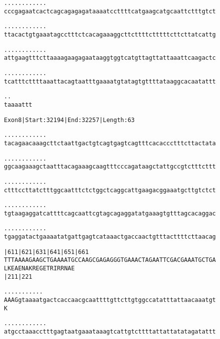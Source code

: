 \documentclass{article}
\begin{document}
\newpage
\begin{alltt}
  .    .    .    .    .    .    .    .    .    .    .    .
cccgagaatcactcagcagagagataaaatccttttcatgaagcatgcaattctttgtct



  .    .    .    .    .    .    .    .    .    .    .    .
ttacactgtgaaatagcctttctcacagaaaggcttcttttctttttcttcttatcattg



  .    .    .    .    .    .    .    .    .    .    .    .
attgaagtttcttaaaagaagagaataaggtggtcatgttagttattaaattcaagactc



  .    .    .    .    .    .    .    .    .    .    .    .
tcatttcttttaaattacagtaatttgaaaatgtatagtgttttataaggcacaatattt



  .    .
taaaattt


\end{alltt}
\newpage
\begin{alltt}
Exon 8 | Start: 32194 | End: 32257 | Length: 63

.    .    .    .    .    .    .    .    .    .    .    .
tacagaacaaagcttctaattgactgtcagtgagtcagtttcacaccctttcttactata



.    .    .    .    .    .    .    .    .    .    .    .
ggcaagaaagctaatttacagaaagcaagtttcccagataagctattgccgtctttcttt



.    .    .    .    .    .    .    .    .    .    .    .
ctttccttatctttggcaatttctctggctcaggcattgaagacggaaatgcttgtctct



.    .    .    .    .    .    .    .    .    .    .    .
tgtaagaggatcattttcagcaattcgtagcagaggatatgaaagtgtttagcacaggac



.    .    .    .    .    .    .    .    .    .    .    .
tgaggatactgaaaatatgattgagtcataaactgaccaactgtttacttttcttaacag



        |611      |621      |631      |641      |651      |661
TTTAAAAGAAGCTGAAAATGCCAAGCGAGAGGGTGAAACTAGAATTCGACGAAATGCTGA
 L  K  E  A  E  N  A  K  R  E  G  E  T  R  I  R  R  N  A  E
                            |211                          |221

        .    .    .    .    .    .    .    .    .    .    .
AAAGgtaaaatgactcaccaacgcaattttgttcttgtggccatatttattaacaaatgt
 K


   .    .    .    .    .    .    .    .    .    .    .    .
atgcctaaacctttgagtaatgaaataaagtcattgtcttttattattatatagatattt



\end{alltt}
\end{document}
